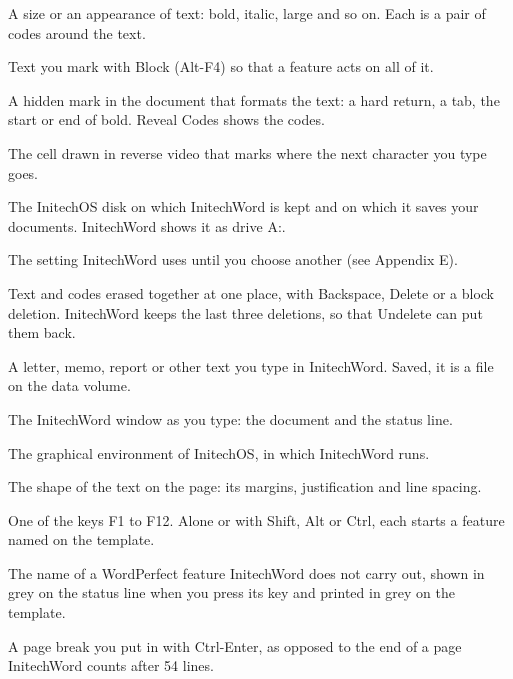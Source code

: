 A size or an appearance of text: bold, italic, large and so on.  Each is a
pair of codes around the text.

Text you mark with Block (Alt-F4) so that a feature acts on all of it.

A hidden mark in the document that formats the text: a hard return, a tab,
the start or end of bold.  Reveal Codes shows the codes.

The cell drawn in reverse video that marks where the next character you type
goes.

The InitechOS disk on which InitechWord is kept and on which it saves your
documents.  InitechWord shows it as drive A:.

The setting InitechWord uses until you choose another (see Appendix E).

Text and codes erased together at one place, with Backspace, Delete or a
block deletion.  InitechWord keeps the last three deletions, so that
Undelete can put them back.

A letter, memo, report or other text you type in InitechWord.  Saved, it is
a file on the data volume.

The InitechWord window as you type: the document and the status line.

The graphical environment of InitechOS, in which InitechWord runs.

The shape of the text on the page: its margins, justification and line
spacing.

One of the keys F1 to F12.  Alone or with Shift, Alt or Ctrl, each starts a
feature named on the template.

The name of a WordPerfect feature InitechWord does not carry out, shown in
grey on the status line when you press its key and printed in grey on the
template.

A page break you put in with Ctrl-Enter, as opposed to the end of a page
InitechWord counts after 54 lines.

